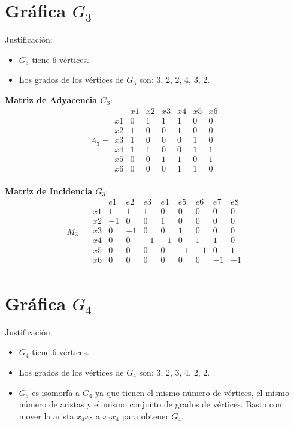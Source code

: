\documentclass{article}
\begin{document}
\section*{Gráfica \( G_3 \)}



Justificación:
\begin{itemize}
    \item \( G_3 \) tiene 6 vértices.
    \item Los grados de los vértices de \( G_3 \) son: 3, 2, 2, 4, 3, 2.
\end{itemize}


\textbf{Matriz de Adyacencia \( G_3 \)}:
\[
A_3 =
\begin{array}{c|cccccc}
    & x1 & x2 & x3 & x4 & x5 & x6 \\
\hline
x1 & 0 & 1 & 1 & 1 & 0 & 0 \\
x2 & 1 & 0 & 0 & 1 & 0 & 0 \\
x3 & 1 & 0 & 0 & 0 & 1 & 0 \\
x4 & 1 & 1 & 0 & 0 & 1 & 1 \\
x5 & 0 & 0 & 1 & 1 & 0 & 1 \\
x6 & 0 & 0 & 0 & 1 & 1 & 0 \\
\end{array}
\]


\textbf{Matriz de Incidencia \( G_3 \)}:
\[
M_3 =
\begin{array}{c|cccccccc}
    & e1 & e2 & e3 & e4 & e5 & e6 & e7 & e8 \\
\hline
x1 & 1  & 1  & 1  & 0  & 0  & 0  & 0  & 0  \\
x2 & -1 & 0  & 0  & 1  & 0  & 0  & 0  & 0  \\
x3 & 0  & -1 & 0  & 0  & 1  & 0  & 0  & 0  \\
x4 & 0  & 0  & -1 & -1 & 0  & 1  & 1  & 0  \\
x5 & 0  & 0  & 0  & 0  & -1 & -1 & 0  & 1  \\
x6 & 0  & 0  & 0  & 0  & 0  & 0  & -1 & -1 \\
\end{array}
\]


\section*{Gráfica \( G_4 \)}


Justificación:
\begin{itemize}
    \item \( G_4 \) tiene 6 vértices.
    \item Los grados de los vértices de \( G_4 \) son: 3, 2, 3, 4, 2, 2.
    \item \( G_3 \) es isomorfa a \( G_4 \) ya que tienen el mismo número de vértices, el mismo número de aristas y el mismo conjunto de grados de vértices. Basta con mover la arista \( x_4x_5 \) a \( x_3x_4 \) para obtener \( G_4 \).
\end{itemize}
\end{document}

